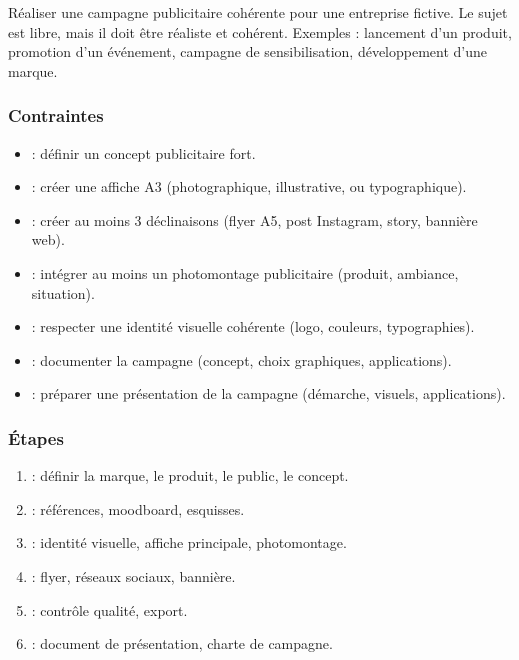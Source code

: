 Réaliser une campagne publicitaire cohérente pour une entreprise fictive. Le sujet est libre, mais il doit être réaliste et cohérent. Exemples : lancement d'un produit, promotion d'un événement, campagne de sensibilisation, développement d'une marque.

\subsubsection*{Contraintes}

\begin{itemize}
    \item {} : définir un concept publicitaire fort.
    \item {} : créer une affiche A3 (photographique, illustrative, ou typographique).
    \item {} : créer au moins 3 déclinaisons (flyer A5, post Instagram, story, bannière web).
    \item {} : intégrer au moins un photomontage publicitaire (produit, ambiance, situation).
    \item {} : respecter une identité visuelle cohérente (logo, couleurs, typographies).
    \item {} : documenter la campagne (concept, choix graphiques, applications).
    \item {} : préparer une présentation de la campagne (démarche, visuels, applications).
\end{itemize}

\subsubsection*{Étapes}

\begin{enumerate}
    \item {} : définir la marque, le produit, le public, le concept.
    \item {} : références, moodboard, esquisses.
    \item {} : identité visuelle, affiche principale, photomontage.
    \item {} : flyer, réseaux sociaux, bannière.
    \item {} : contrôle qualité, export.
    \item {} : document de présentation, charte de campagne.
\end{enumerate}

